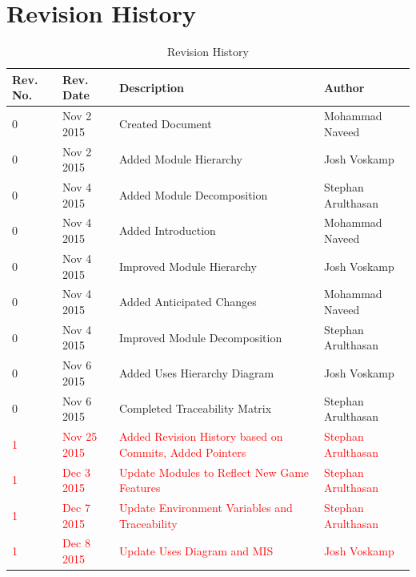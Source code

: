 \documentclass[12pt]{article}
\begin{document}
\newpage
\tableofcontents
\newpage
\listoftables
{}
\newpage
\listoffigures
{}
\newpage

\section*{Revision History}
\begin{table}[!htbp]
	\centering
	 \begin{tabular}{ | p{2cm} |  p{2cm} | p{5cm} | p{3.8cm} |}
		\hline
		Rev. No. & Rev. Date & Description & Author \\\hline
		0 & Nov 2 2015 & Created Document & Mohammad Naveed \\\hline
		0 & Nov 2 2015 & Added Module Hierarchy & Josh Voskamp \\\hline
		0 & Nov 4 2015 & Added Module Decomposition & Stephan Arulthasan\\\hline
		0 & Nov 4 2015 & Added Introduction & Mohammad Naveed \\\hline
		0 & Nov 4 2015 & Improved Module Hierarchy & Josh Voskamp \\\hline
		0 & Nov 4 2015 & Added Anticipated Changes & Mohammad Naveed \\\hline
		0 & Nov 4 2015 & Improved Module Decomposition & Stephan Arulthasan \\\hline
		0 & Nov 6 2015 & Added Uses Hierarchy Diagram & Josh Voskamp \\\hline
		0 & Nov 6 2015 & Completed Traceability Matrix & Stephan Arulthasan \\\hline
		\textcolor{red}{1}&\textcolor{red}{Nov 25 2015}&\textcolor{red}{Added Revision History based on Commits, Added Pointers}&\textcolor{red}{Stephan Arulthasan}\\\hline
		\textcolor{red}{1}&\textcolor{red}{Dec 3 2015}&\textcolor{red}{Update Modules to Reflect New Game Features}&\textcolor{red}{Stephan Arulthasan}\\\hline
		\textcolor{red}{1}&\textcolor{red}{Dec 7 2015}&\textcolor{red}{Update Environment Variables and Traceability}&\textcolor{red}{Stephan Arulthasan}\\\hline
		\textcolor{red}{1}&\textcolor{red}{Dec 8 2015}&\textcolor{red}{Update Uses Diagram and MIS}&\textcolor{red}{Josh Voskamp}\\\hline
		
	\end{tabular}
	\caption{Revision History}
\end{table}
\newpage
\end{document}

